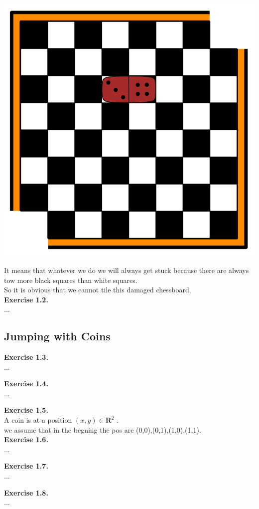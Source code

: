 \documentclass{article}
\begin{document}
\begin{flushleft}
\begin{center}
\includegraphics[scale=0.3]{2.png}
\end{center}
It means that whatever we do we will always get stuck because there are always tow more black squares than white squares.\\
So it is obvious that we cannot tile this damaged chessboard.\\

\textbf{Exercise 1.2.} \\
...

\end{flushleft}
\subsection{Jumping with Coins}

\begin{flushleft}
\textbf{Exercise 1.3.} \\
...

\textbf{Exercise 1.4.} \\
...

\textbf{Exercise 1.5.} \\
A coin is at a position $(x,y)\in\mathbf{R}^2$ .\\
we assume that in the begning the pos are (0,0),(0,1),(1,0),(1,1).\\


\textbf{Exercise 1.6.} \\
...

\textbf{Exercise 1.7.} \\
...

\textbf{Exercise 1.8.} \\
...

\end{flushleft}
\end{document}
